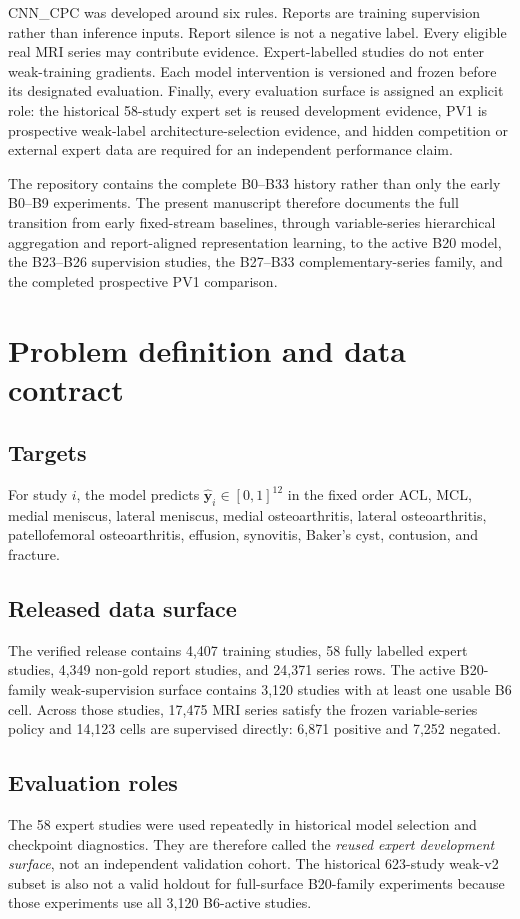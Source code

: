 \documentclass[preprint,12pt]{elsarticle}
\begin{document}
CNN\_CPC was developed around six rules. Reports are training supervision rather than inference inputs. Report silence is not a negative label. Every eligible real MRI series may contribute evidence. Expert-labelled studies do not enter weak-training gradients. Each model intervention is versioned and frozen before its designated evaluation. Finally, every evaluation surface is assigned an explicit role: the historical 58-study expert set is reused development evidence, PV1 is prospective weak-label architecture-selection evidence, and hidden competition or external expert data are required for an independent performance claim.

The repository contains the complete B0--B33 history rather than only the early B0--B9 experiments. The present manuscript therefore documents the full transition from early fixed-stream baselines, through variable-series hierarchical aggregation and report-aligned representation learning, to the active B20 model, the B23--B26 supervision studies, the B27--B33 complementary-series family, and the completed prospective PV1 comparison.

\section{Problem definition and data contract}
\label{sec:problem}

\subsection{Targets}
For study $i$, the model predicts $\hat{\mathbf y}_i\in[0,1]^{12}$ in the fixed order ACL, MCL, medial meniscus, lateral meniscus, medial osteoarthritis, lateral osteoarthritis, patellofemoral osteoarthritis, effusion, synovitis, Baker's cyst, contusion, and fracture.

\subsection{Released data surface}
The verified release contains 4,407 training studies, 58 fully labelled expert studies, 4,349 non-gold report studies, and 24,371 series rows. The active B20-family weak-supervision surface contains 3,120 studies with at least one usable B6 cell. Across those studies, 17,475 MRI series satisfy the frozen variable-series policy and 14,123 cells are supervised directly: 6,871 positive and 7,252 negated.

\subsection{Evaluation roles}
The 58 expert studies were used repeatedly in historical model selection and checkpoint diagnostics. They are therefore called the \emph{reused expert development surface}, not an independent validation cohort. The historical 623-study weak-v2 subset is also not a valid holdout for full-surface B20-family experiments because those experiments use all 3,120 B6-active studies.
\end{document}
